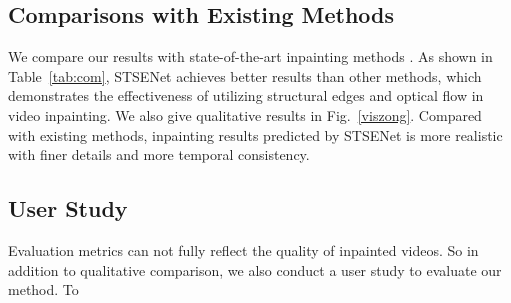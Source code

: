 \subsection{Comparisons with Existing Methods}
We compare our results with state-of-the-art inpainting methods \cite{nazeri2019edgeconnect,wang2019video,Xu_2019_CVPR,Kim_2019_CVPR1}. 
As shown in Table~\ref{tab:com}, STSENet achieves better results than other methods, which demonstrates the effectiveness of utilizing structural edges and optical flow in video inpainting.
We also give qualitative results in Fig.~\ref{viszong}. Compared with existing methods, inpainting results predicted by STSENet is more realistic with finer details and more temporal consistency.
\begin{table}[t]
	\caption{Comparisons with existing methods.}\smallskip
	
	\centering
	\label{tab:sem}
\end{table}

\subsection{User Study}
Evaluation metrics can not fully reflect the quality of inpainted videos. So in addition to qualitative comparison, we also conduct a user study to evaluate our method. To


